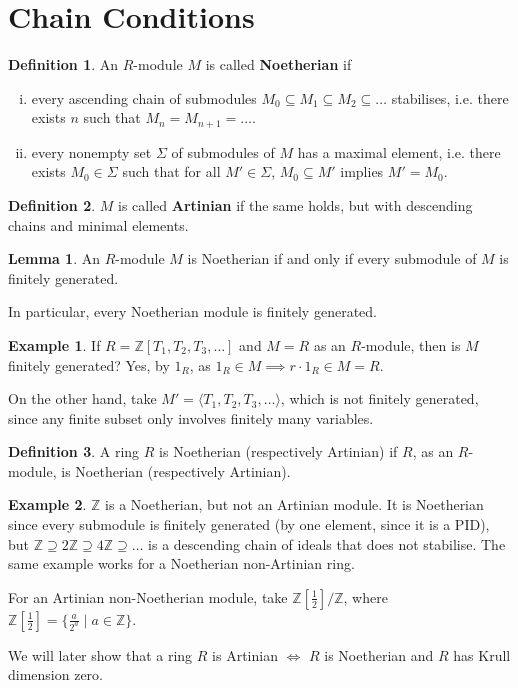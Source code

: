 \documentclass{article}
\theoremstyle{definition}
\newtheorem{lemma}[theorem]{Lemma}
\newtheorem{example}{Example}[section]
\newtheorem{defn}{Definition}[section]
\begin{document}
\section{Chain Conditions}
\begin{defn}
    An $R$-module $M$ is called \textbf{Noetherian} if 
    \begin{enumerate}[(i)]
        \item every ascending chain of submodules $M_0 \subseteq M_1 \subseteq M_2 \subseteq \dots$ stabilises, i.e. there exists $n$ such that $M_n = M_{n+1} = \dots$.
        \item every nonempty set $\Sigma$ of submodules of $M$ has a maximal element, i.e. there exists $M_0 \in \Sigma$ such that for all $M' \in \Sigma$, $M_0 \subseteq M'$ implies $M' = M_0$.
    \end{enumerate}
\end{defn}
\begin{defn}
    $M$ is called \textbf{Artinian} if the same holds, but with descending chains and minimal elements.
\end{defn}
\begin{lemma}
    An $R$-module $M$ is Noetherian if and only if every submodule of $M$ is finitely generated.
\end{lemma}
In particular, every Noetherian module is finitely generated.
\begin{example}
    If $R = \mathbb{Z}[T_1,T_2,T_3,\ldots]$ and $M=R$ as an $R$-module, then is $M$ finitely generated? Yes, by $1_R$, as $1_R \in M \implies r \cdot 1_R \in M = R$.
    \vspace{1mm}
     
    On the other hand, take $M' = \langle T_1,T_2,T_3, \ldots \rangle$, which is not finitely generated, since any finite subset only involves finitely many variables.
\end{example}
\begin{defn}
    A ring $R$ is Noetherian (respectively Artinian) if $R$, as an $R$-module, is Noetherian (respectively Artinian).
\end{defn}
\begin{example}
    $\mathbb{Z}$ is a Noetherian, but not an Artinian module. It is Noetherian since every submodule is finitely generated (by one element, since it is a PID), but $\mathbb{Z} \supseteq 2\mathbb{Z} \supseteq 4\mathbb{Z} \supseteq \dots$ is a descending chain of ideals that does not stabilise. The same example works for a Noetherian non-Artinian ring.
    \vspace{1mm}
     
    For an Artinian non-Noetherian module, take $\mathbb{Z}[\frac{1}{2}]/\mathbb{Z}$, where $\mathbb{Z}[\frac{1}{2}] = \{\frac{a}{2^a} \mid a \in \mathbb{Z} \}$.
\end{example}
We will later show that a ring $R$ is Artinian $\iff$ $R$ is Noetherian and $R$ has Krull dimension zero.
\end{document}
